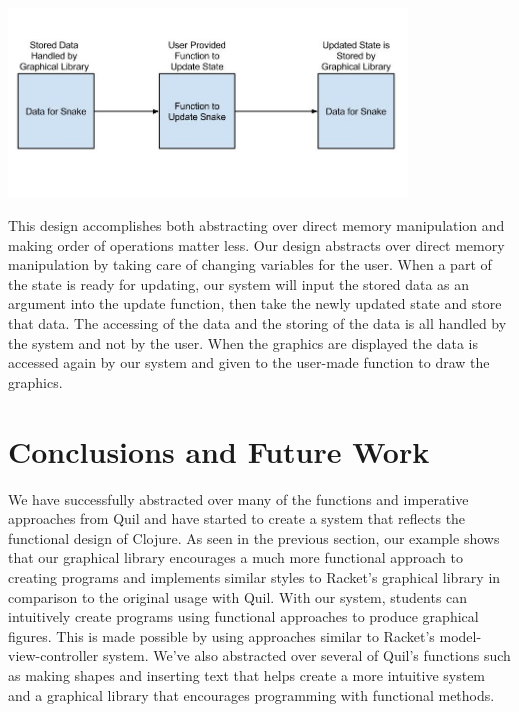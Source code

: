 \documentclass[12pt]{article}
\newcommand{\comment}[1]{{\bf \tt  {#1}}}
\newcommand{\emcomment}[1]{\textcolor{ForestGreen}{\comment{Elena: {#1}}}}
\begin{document}
\begin{center}
\includegraphics[width=300pt]{Handling_State_in_Graphical_Library}
\end{center}
 
This design accomplishes both abstracting over direct memory manipulation and making order of operations matter less. Our design abstracts over direct memory manipulation by taking care of changing variables for the user. When a part of the state is ready for updating, our system will input the stored data as an argument into the update function, then take the newly updated state and store that data. The accessing of the data and the storing of the data is all handled by the system and not by the user. When the graphics are displayed the data is accessed again by our system and given to the user-made function to draw the graphics.

\section{Conclusions and Future Work}\label{sec:future-work}
We have successfully abstracted over many of the functions and imperative approaches from Quil and have started to create a system that reflects the functional design of Clojure. As seen in the previous section, our example shows that our graphical library encourages a much more functional approach to creating programs and implements similar styles to Racket's graphical library in comparison to the original usage with Quil. With our system, students can intuitively create programs using functional approaches to produce graphical figures. This is made possible by using approaches similar to Racket's model-view-controller system. We've also abstracted over several of Quil's functions such as making shapes and inserting text that helps create a more intuitive system and a graphical library that encourages programming with functional methods.%
\end{document}
